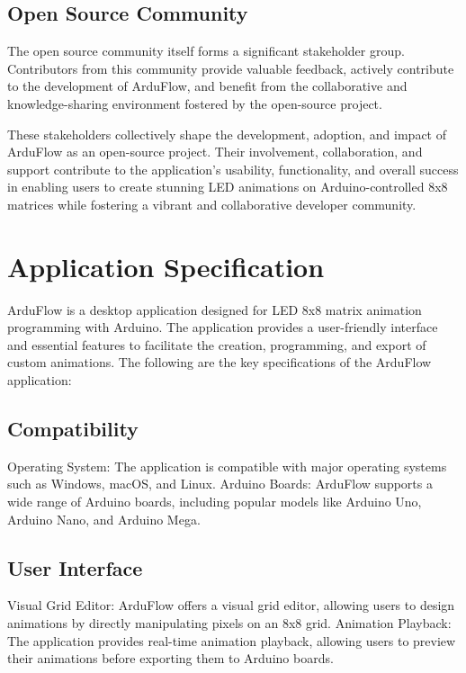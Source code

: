 \documentclass[a4paper, 11pt]{article}
\begin{document}
    \subsection{Open Source Community}
    The open source community itself forms a significant stakeholder group. Contributors from this community provide valuable feedback, actively contribute to the development of ArduFlow, and benefit from the collaborative and knowledge-sharing environment fostered by the open-source project. \par
\bigbreak
These stakeholders collectively shape the development, adoption, and impact of ArduFlow as an open-source project. Their involvement, collaboration, and support contribute to the application's usability, functionality, and overall success in enabling users to create stunning LED animations on Arduino-controlled 8x8 matrices while fostering a vibrant and collaborative developer community.

\section{Application Specification}

ArduFlow is a desktop application designed for LED 8x8 matrix animation programming with Arduino. The application provides a user-friendly interface and essential features to facilitate the creation, programming, and export of custom animations. The following are the key specifications of the ArduFlow application:

    \subsection{Compatibility}
        Operating System: The application is compatible with major operating systems such as Windows, macOS, and Linux.
        Arduino Boards: ArduFlow supports a wide range of Arduino boards, including popular models like Arduino Uno, Arduino Nano, and Arduino Mega.

    \subsection{User Interface}
        Visual Grid Editor: ArduFlow offers a visual grid editor, allowing users to design animations by directly manipulating pixels on an 8x8 grid.
        Animation Playback: The application provides real-time animation playback, allowing users to preview their animations before exporting them to Arduino boards.
\end{document}

